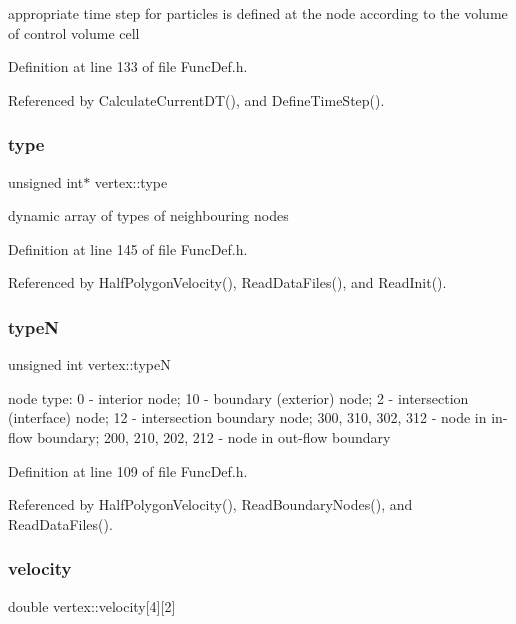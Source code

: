 appropriate time step for particles is defined at the node according to the volume of control volume cell 

Definition at line 133 of file Func\+Def.\+h.



Referenced by Calculate\+Current\+D\+T(), and Define\+Time\+Step().

\mbox{\label{structvertex_aeabf5788639be2723927c854aa11cd33}} 
\subsubsection{\texorpdfstring{type}{type}}
{\footnotesize\ttfamily unsigned int$\ast$ vertex\+::type}

dynamic array of types of neighbouring nodes 

Definition at line 145 of file Func\+Def.\+h.



Referenced by Half\+Polygon\+Velocity(), Read\+Data\+Files(), and Read\+Init().

\mbox{\label{structvertex_aa8c5c50393696a507d20dda8ec69fd51}} 
\subsubsection{\texorpdfstring{typeN}{typeN}}
{\footnotesize\ttfamily unsigned int vertex\+::typeN}

node type\+: 0 -\/ interior node; 10 -\/ boundary (exterior) node; 2 -\/ intersection (interface) node; 12 -\/ intersection boundary node; 300, 310, 302, 312 -\/ node in in-\/flow boundary; 200, 210, 202, 212 -\/ node in out-\/flow boundary 

Definition at line 109 of file Func\+Def.\+h.



Referenced by Half\+Polygon\+Velocity(), Read\+Boundary\+Nodes(), and Read\+Data\+Files().

\mbox{\label{structvertex_a92493253fc12b459eb0599ec07c56743}} 
\subsubsection{\texorpdfstring{velocity}{velocity}}
{\footnotesize\ttfamily double vertex\+::velocity\mbox{[}4\mbox{]}\mbox{[}2\mbox{]}}

